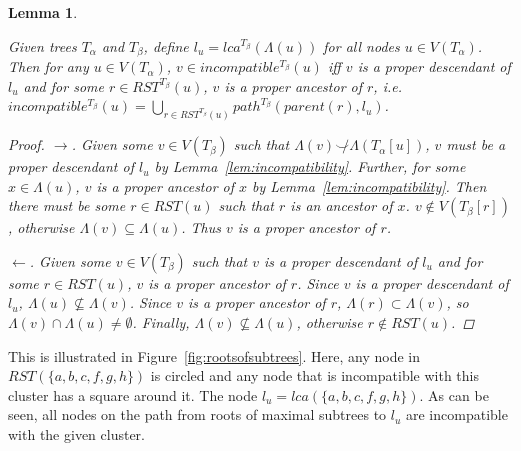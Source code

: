 \documentclass{article}
\newcommand{\compatible}{\smile}
\newcommand{\leafset}{\Lambda}
\newtheorem{incompatibilityrootsofsubtrees}[incompatibility]{Lemma}
\begin{document}
    \begin{incompatibilityrootsofsubtrees}
        \label{lem:incompatibilityrootsofsubtrees}

        Given trees $T_\alpha$ and $T_\beta$, define $l_u = lca^{T_\beta}(\leafset(u))$ for all nodes $u \in V(T_\alpha)$. Then for any $u \in V(T_\alpha)$, $v \in incompatible^{T_\beta}(u)$ iff $v$ is a proper descendant of $l_u$ and for some $r \in RST^{T_\beta}(u)$, $v$ is a proper ancestor of $r$, i.e. $incompatible^{T_\beta}(u) = \bigcup_{r \in RST^{T_\beta}(u)} path^{T_\beta}(parent(r), l_u)$.

        \begin{proof}
            $\longrightarrow$. Given some $v \in V(T_\beta)$ such that $\leafset(v) \not\compatible \leafset(T_\alpha[u])$, $v$ must be a proper descendant of $l_u$ by Lemma~\ref{lem:incompatibility}. Further, for some $x \in \leafset(u)$, $v$ is a proper ancestor of $x$ by Lemma~\ref{lem:incompatibility}. Then there must be some $r \in RST(u)$ such that $r$ is an ancestor of $x$. $v \not\in V(T_\beta[r])$, otherwise $\leafset(v) \subseteq \leafset(u)$. Thus $v$ is a proper ancestor of $r$.

            $\longleftarrow$. Given some $v \in V(T_\beta)$ such that $v$ is a proper descendant of $l_u$ and for some $r \in RST(u)$, $v$ is a proper ancestor of $r$. Since $v$ is a proper descendant of $l_u$, $\leafset(u) \not\subseteq \leafset(v)$. Since $v$ is a proper ancestor of $r$, $\leafset(r) \subset \leafset(v)$, so $\leafset(v) \cap \leafset(u) \neq \emptyset$. Finally, $\leafset(v) \not\subseteq \leafset(u)$, otherwise $r \not\in RST(u)$.
        \end{proof}
    \end{incompatibilityrootsofsubtrees}

    This is illustrated in Figure~\ref{fig:rootsofsubtrees}. Here, any node in $RST(\{a, b, c, f, g, h\})$ is circled and any node that is incompatible with this cluster has a square around it. The node $l_u = lca(\{a, b, c, f, g, h\})$. As can be seen, all nodes on the path from roots of maximal subtrees to $l_u$ are incompatible with the given cluster.
\end{document}
